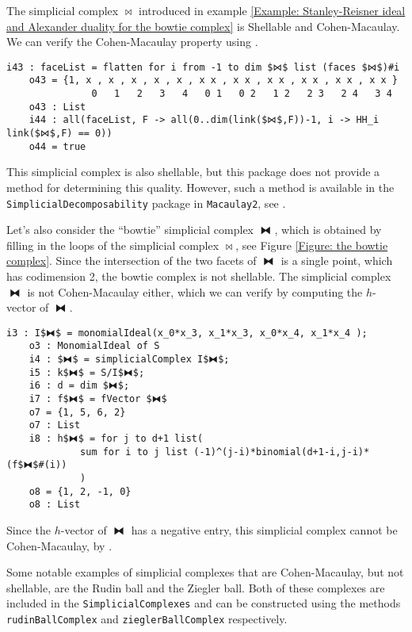 \documentclass[12pt,leqno]{amsart}
\theoremstyle{definition}
\newenvironment{example}
{\pushQED{\qed}\renewcommand{\qedsymbol}{$\diamond$}\examplex}
{\popQED\endexamplex}
\begin{document}
\begin{example}\label{Example: Shellability, the Cohen-Macaulay property, and the h-vector}
  The simplicial complex $\bowtie$ introduced in example \ref{Example: Stanley-Reisner ideal and Alexander duality for the bowtie complex} is Shellable and Cohen-Macaulay. We can verify the Cohen-Macaulay property using \cite[Corollary 5.3.9]{BH}.
\begin{lstlisting}[basicstyle={\ttfamily \scriptsize}, xleftmargin=-23pt]
    i43 : faceList = flatten for i from -1 to dim $⋈$ list (faces $⋈$)#i
    o43 = {1, x , x , x , x , x , x x , x x , x x , x x , x x , x x }
               0   1   2   3   4   0 1   0 2   1 2   2 3   2 4   3 4
    o43 : List
    i44 : all(faceList, F -> all(0..dim(link($⋈$,F))-1, i -> HH_i link($⋈$,F) == 0))
    o44 = true
\end{lstlisting}
  This simplicial complex is also shellable, but this package does not provide a method for determining this quality. However, such a method is available in the \texttt{SimplicialDecomposability} package in \texttt{Macaulay2}, see \cite{Cook}.

  Let's also consider the ``bowtie'' simplicial complex $\fbowtie$, which is obtained by filling in the loops of the simplicial complex $\bowtie$, see Figure \ref{Figure: the bowtie complex}. Since the intersection of the two facets of $\fbowtie$ is a single point, which has codimension 2, the bowtie complex is not shellable. The simplicial complex $\fbowtie$ is not Cohen-Macaulay either, which we can verify by computing the $h$-vector of $\fbowtie$.
\begin{lstlisting}[basicstyle={\ttfamily \scriptsize}, xleftmargin=-23pt]
    i3 : I$⧓$ = monomialIdeal(x_0*x_3, x_1*x_3, x_0*x_4, x_1*x_4 );
    o3 : MonomialIdeal of S
    i4 : $⧓$ = simplicialComplex I$⧓$;
    i5 : k$⧓$ = S/I$⧓$;
    i6 : d = dim $⧓$;
    i7 : f$⧓$ = fVector $⧓$
    o7 = {1, 5, 6, 2}
    o7 : List
    i8 : h$⧓$ = for j to d+1 list(
             sum for i to j list (-1)^(j-i)*binomial(d+1-i,j-i)*(f$⧓$#(i))
             )
    o8 = {1, 2, -1, 0}
    o8 : List
\end{lstlisting}
  Since the $h$-vector of $\fbowtie$ has a negative entry, this simplicial complex cannot be Cohen-Macaulay, by \cite[Lemma 5.1.10]{BH}.

  Some notable examples of simplicial complexes that are Cohen-Macaulay, but not shellable, are the Rudin ball and the Ziegler ball. Both of these complexes are included in the \texttt{SimplicialComplexes} and can be constructed using the methods \texttt{rudinBallComplex} and \texttt{zieglerBallComplex} respectively.
\end{example}
\end{document}
